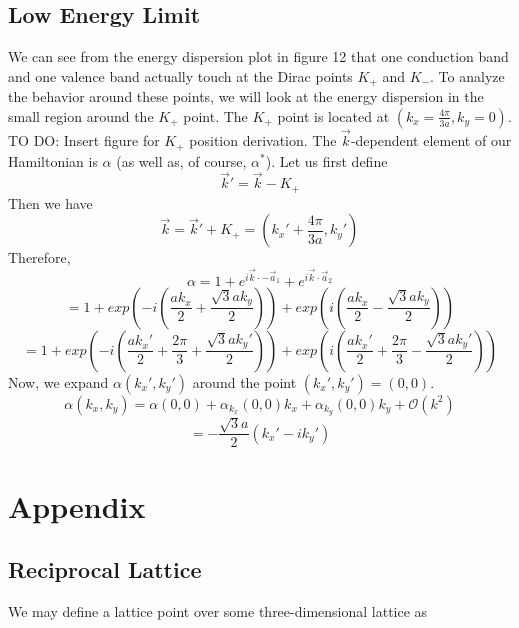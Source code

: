 \documentclass{article}
\begin{document}
\subsection{Low Energy Limit}
We can see from the energy dispersion plot in figure 12 that one conduction band and one valence band actually touch at the Dirac points $K_{+}$ and $K_{-}$.
To analyze the behavior around these points, we will look at the energy dispersion in the small region around the $K_{+}$ point. The $K_{+}$ point is located at
$(k_{x} = \frac{4\pi}{3a}, k_{y} = 0)$. TO DO: Insert figure for $K_{+}$ position derivation.
The $\vec{k}$-dependent element of our Hamiltonian is $\alpha$ (as well as, of course, $\alpha^{*}$). Let us first define
\begin{equation}
\vec{k}' = \vec{k} - K_{+}
\end{equation}
Then we have
\begin{equation}
\vec{k} = \vec{k}' + K_{+} = (k_{x}' + \frac{4\pi}{3a}, k_{y}')
\end{equation}
Therefore,
$$
\alpha = 1 + e^{i\vec{k}\cdot-\vec{a}_{1}} + e^{i\vec{k}\cdot\vec{a}_{2}}
$$
\begin{equation}
 = 1 + exp\left (-i\left (\frac{ak_{x}}{2} + \frac{\sqrt{3}ak_{y}}{2}\right )\right ) + exp\left (i\left (\frac{ak_{x}}{2} - \frac{\sqrt{3}ak_{y}}{2}\right )\right )
\end{equation}
\begin{equation}
 = 1 + exp\left (-i\left (\frac{ak_{x}'}{2} + \frac{2\pi}{3} + \frac{\sqrt{3}ak_{y}'}{2}\right )\right ) + exp\left (i\left (\frac{ak_{x}'}{2} + \frac{2\pi}{3} - \frac{\sqrt{3}ak_{y}'}{2}\right )\right )
\end{equation}
Now, we expand $\alpha(k_{x}', k_{y}')$ around the point $(k_{x}', k_{y}') = (0,0)$.
\begin{equation}
\alpha(k_{x}, k_{y}) = \alpha(0,0) + \alpha_{k_{x}}(0,0)k_{x} + \alpha_{k_{y}}(0,0)k_{y} + \mathcal{O}(k^{2})
\end{equation}
\begin{equation}
= -\frac{\sqrt{3}a}{2}(k_{x}' - ik_{y}')
\end{equation}


\section{Appendix}
\subsection{Reciprocal Lattice}
We may define a lattice point over some three-dimensional lattice as
\end{document}
